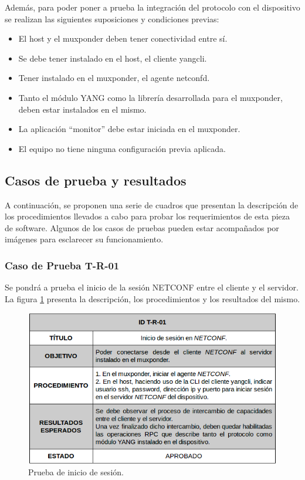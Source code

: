 Además, para poder poner a prueba la integración del protocolo con el dispositivo se realizan las siguientes suposiciones y condiciones previas:

\begin{itemize}
	\item El host y el muxponder deben tener conectividad entre sí.
    \item Se debe tener instalado en el host, el cliente yangcli.
    \item Tener instalado en el muxponder, el agente netconfd.
    \item Tanto el módulo YANG como la librería desarrollada para el muxponder, deben estar instalados en el mismo.
    \item La aplicación “monitor” debe estar iniciada en el muxponder.
    \item El equipo no tiene ninguna configuración previa aplicada.
\end{itemize}


\subsection{Casos de prueba y resultados}

A continuación, se proponen una serie de cuadros que presentan la descripción de los procedimientos llevados a cabo para probar los requerimientos de esta pieza de software. Algunos de los casos de pruebas pueden estar acompañados por imágenes para esclarecer su funcionamiento.

\subsubsection{Caso de Prueba T-R-01}
Se pondrá a prueba el inicio de la sesión NETCONF entre el cliente y el servidor. La figura \ref{fig:test1} presenta la descripción, los procedimientos y los resultados del mismo. 


\begin{figure}[H]
	\centering
	\includegraphics[scale=0.6]{Figures/test_uno.png}
	\caption{Prueba de inicio de sesión.}
	\label{fig:test1}
  \end{figure}



